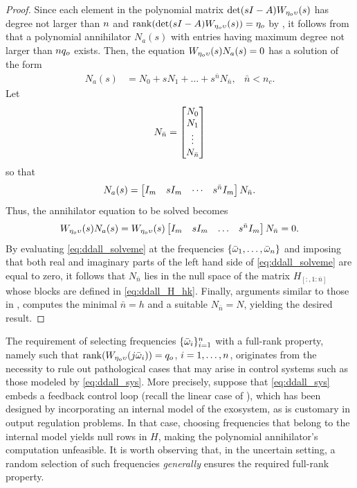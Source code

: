 \begin{proof}
  Since each element in the polynomial matrix $\det(sI-A)W_{\eta_o\upsilon}(s)$ has degree not larger than $n$ and $\operatorname{rank}(\det(sI-A)W_{\eta_o\upsilon}(s))=\eta_o$ by , it follows from \cite[Prop. 1]{zuniga_anaya_improved_2009} that a polynomial annihilator $N_a(s)$ with entries having maximum degree not larger than $n{q_o}$ exists. Then, the equation $W_{\eta_o\upsilon}(s)N_a(s) = 0$ has a solution of the form
  \begin{align}
    N_a(s) &= N_0 + sN_1 + \dotsc + s^{\bar{n}}N_{\bar{n}}, & \bar{n} < n_c.
  \end{align}
	Let
  \begin{equation}
    N_{\bar{n}} = \begin{bmatrix}N_0 \\ N_1 \\ \vdots \\ N_{\bar{n}}\end{bmatrix}
  \end{equation}
  so that
  \begin{equation}
    N_a(s) = \begin{bmatrix}I_m & sI_m & \cdots & s^{\bar{n}}I_m\end{bmatrix}N_{\bar{n}}.
  \end{equation}
  Thus, the annihilator equation to be solved becomes
  \begin{equation}
    \label{eq:ddall_solveme}
    W_{\eta_o\upsilon}(s)N_a(s) = W_{\eta_o\upsilon}(s)\begin{bmatrix}I_m & sI_m & \dotsc & s^{\bar{n}}I_m\end{bmatrix}N_{\bar{n}} = 0.
  \end{equation}
  By evaluating \eqref{eq:ddall_solveme} at the frequencies $\{\bar{\omega}_1,\dotsc,\bar{\omega}_n\}$ and imposing that both real and imaginary parts of the left hand side of \eqref{eq:ddall_solveme} are equal to zero, it follows that $N_{\bar{n}}$ lies in the null space of the matrix $H_{[:,1:\bar{n}]}$ whose blocks are defined in \eqref{eq:ddall_H_hk}. Finally, arguments similar to those in \cite{zuniga_anaya_improved_2009},  computes the minimal $\bar{n}=h$ and a suitable $N_{\bar{n}}=N$, yielding the desired result.
\end{proof}

\begin{remark}
  \label{rem:ddall_freqschoice}
  The requirement of selecting frequencies $\{\bar{\omega}_i\}_{i=1}^n$ with a full-rank property, namely	such that $\operatorname{rank}(W_{\eta_o\upsilon}(j\bar{\omega}_i)) = {q_o}$, $i = 1,\dotsc,n$,	originates from the necessity to rule out pathological cases that may	arise in control systems such as those modeled by \eqref{eq:ddall_sys}. More precisely, suppose that \eqref{eq:ddall_sys} embeds a feedback control loop (recall the linear case of ), which has been designed by incorporating an internal model of the exosystem, as is customary in output regulation problems. In that case, choosing frequencies	that belong to the internal model yields null rows in $H$, making the polynomial annihilator's computation unfeasible. It is worth observing that, in the uncertain setting, a random selection of such frequencies \emph{generally} ensures the required full-rank property.\closeremark
\end{remark}

